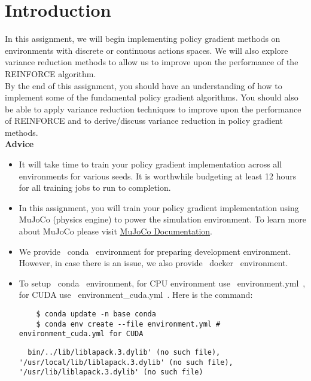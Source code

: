 \section{Introduction}

In this assignment, we will begin implementing policy gradient methods on environments with discrete or continuous actions spaces. We will also explore variance reduction methods to allow us to improve upon the performance of the REINFORCE algorithm. \\

By the end of this assignment, you should have an understanding of how to implement some of the fundamental policy gradient algorithms. You should also be able to apply variance reduction techniques to improve upon the performance of REINFORCE and to derive/discuss variance reduction in policy gradient methods. \\

\textbf{Advice}

\begin{itemize}
  \item It will take time to train your policy gradient implementation across all environments for various seeds. It is worthwhile budgeting at least 12 hours for all training jobs to run to completion.

  \item In this assignment, you will train your policy gradient implementation using MuJoCo (physics engine) to power the simulation environment. To learn more about MuJoCo please visit \href{https://mujoco.readthedocs.io/en/latest/overview.html}{MuJoCo Documentation}.

  \item We provide ~conda~ environment for preparing development environment. However, in case there is an issue, we also provide ~docker~ environment.

  \item To setup ~conda~ environment, for CPU environment use ~environment.yml~, for CUDA use ~environment_cuda.yml~. Here is the command:
    \begin{lstlisting}
    $ conda update -n base conda
    $ conda env create --file environment.yml #  environment_cuda.yml for CUDA
    \end{lstlisting}

  \begin{lstlisting}
  bin/../lib/liblapack.3.dylib' (no such file), '/usr/local/lib/liblapack.3.dylib' (no such file), '/usr/lib/liblapack.3.dylib' (no such file)
  \end{lstlisting}


\end{itemize}

